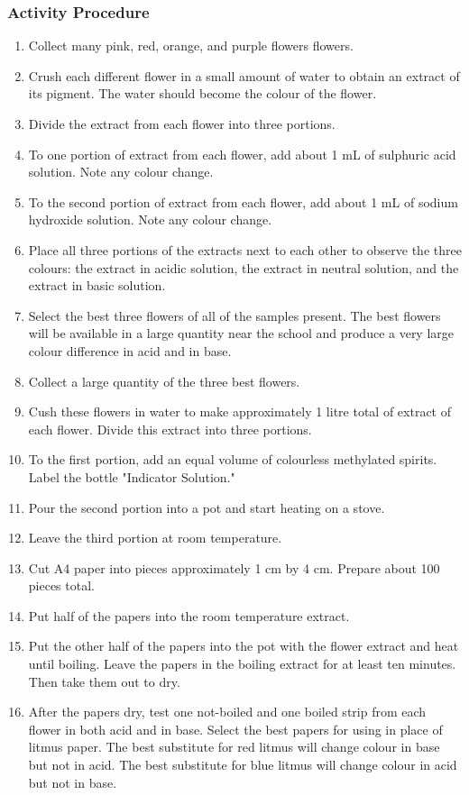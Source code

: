\subsubsection*{Activity Procedure}
\begin{enumerate}
\item{Collect many pink, red, orange, and purple flowers flowers.}
\item{Crush each different flower in a small amount of water to obtain an extract of its pigment. The water should become the colour of the flower.}
\item{Divide the extract from each flower into three portions.}
\item{To one portion of extract from each flower, add about 1 mL of sulphuric acid solution. Note any colour change.}
\item{To the second portion of extract from each flower, add about 1 mL of sodium hydroxide solution. Note any colour change.}
\item{Place all three portions of the extracts next to each other to observe the three colours: the extract in acidic solution, the extract in neutral solution, and the extract in basic solution.}
\item{Select the best three flowers of all of the samples present. The best flowers will be available in a large quantity near the school and produce a very large colour difference in acid and in base.}
\item{Collect a large quantity of the three best flowers.}
\item{Cush these flowers in water to make approximately 1 litre total of extract of each flower. Divide this extract into three portions.}
\item{To the first portion, add an equal volume of colourless methylated spirits. Label the bottle "Indicator Solution."}
\item{Pour the second portion into a pot and start heating on a stove.}
\item{Leave the third portion at room temperature.}
\item{Cut A4 paper into pieces approximately 1 cm by 4 cm. Prepare about 100 pieces total.}
\item{Put half of the papers into the room temperature extract.}
\item{Put the other half of the papers into the pot with the flower extract and heat until boiling. Leave the papers in the boiling extract for at least ten minutes. Then take them out to dry.}
\item{After the papers dry, test one not-boiled and one boiled strip from each flower in both acid and in base. Select the best papers for using in place of litmus paper. The best substitute for red litmus will change colour in base but not in acid. The best substitute for blue litmus will change colour in acid but not in base.}
\end{enumerate}

